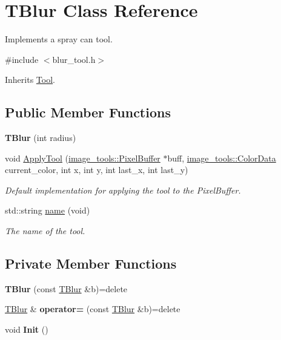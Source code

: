 \hypertarget{classTBlur}{}\section{T\+Blur Class Reference}
\label{classTBlur}


Implements a spray can tool.  




{\ttfamily \#include $<$blur\+\_\+tool.\+h$>$}



Inherits \hyperlink{classTool}{Tool}.

\subsection*{Public Member Functions}
\begin{DoxyCompactItemize}
\item 
{\bfseries T\+Blur} (int radius)\hypertarget{classTBlur_a99a7509fd30c2a88477a133de2dea0cb}{}\label{classTBlur_a99a7509fd30c2a88477a133de2dea0cb}

\item 
void \hyperlink{classTBlur_a5cbb567f1a5fae0c313f9fbf733aff3c}{Apply\+Tool} (\hyperlink{classimage__tools_1_1PixelBuffer}{image\+\_\+tools\+::\+Pixel\+Buffer} $\ast$buff, \hyperlink{classimage__tools_1_1ColorData}{image\+\_\+tools\+::\+Color\+Data} current\+\_\+color, int x, int y, int last\+\_\+x, int last\+\_\+y)
\begin{DoxyCompactList}\small\item\em Default implementation for applying the tool to the Pixel\+Buffer. \end{DoxyCompactList}\item 
std\+::string \hyperlink{classTBlur_a245f204d4009ae94a423e5eee09d6515}{name} (void)
\begin{DoxyCompactList}\small\item\em The name of the tool. \end{DoxyCompactList}\end{DoxyCompactItemize}
\subsection*{Private Member Functions}
\begin{DoxyCompactItemize}
\item 
{\bfseries T\+Blur} (const \hyperlink{classTBlur}{T\+Blur} \&b)=delete\hypertarget{classTBlur_a2e57cb49e407d876870c599c47ac648d}{}\label{classTBlur_a2e57cb49e407d876870c599c47ac648d}

\item 
\hyperlink{classTBlur}{T\+Blur} \& {\bfseries operator=} (const \hyperlink{classTBlur}{T\+Blur} \&b)=delete\hypertarget{classTBlur_ab2ac85f99ed307636bfc9b6c5e21c36d}{}\label{classTBlur_ab2ac85f99ed307636bfc9b6c5e21c36d}

\item 
void {\bfseries Init} ()\hypertarget{classTBlur_a16285b381c5981c9b7cbd39b47fc492c}{}\label{classTBlur_a16285b381c5981c9b7cbd39b47fc492c}

\end{DoxyCompactItemize}
